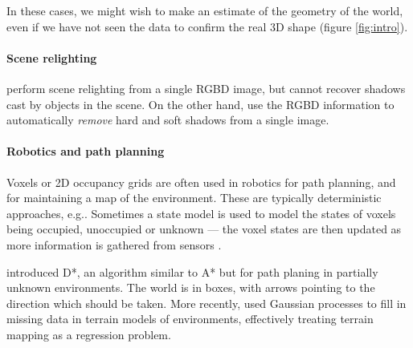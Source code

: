 \documentclass[10pt,twocolumn,letterpaper]{article}
\makeatletter
\renewcommand*{\eg}{e.g.\@\xspace}
\newcommand*{\ea}{et al.\@\xspace}
\makeatother
\begin{document}
In these cases, we might wish to make an estimate of the geometry of the world, even if we have not seen the data to confirm the real 3D shape (figure \ref{fig:intro}).




\paragraph{Scene relighting}
\cite{ikeda-acpr-2013} perform scene relighting from a single RGBD image, but cannot recover shadows cast by objects in the scene.
On the other hand, \cite{xiao-cvpr-2014} use the RGBD information to automatically \textit{remove} hard and soft shadows from a single image.

\paragraph{Robotics and path planning}
Voxels or 2D occupancy grids are often used in robotics for path planning, and for maintaining a map of the environment. 
These are typically deterministic approaches, \eg \cite{jetchev-icra-2010}. Sometimes a state model is used to model the states of voxels being occupied, unoccupied or unknown --- the voxel states are then updated as more information is gathered from sensors \cite{toussaint-techreport-2007}.

\cite{stentz-icra-1994} introduced D*, an algorithm similar to A* but for path planing in partially unknown environments. 
The world is in boxes, with arrows pointing to the direction which should be taken.
More recently, \cite{plagemann-iros-2008} used Gaussian processes to fill in missing data in terrain models of environments, effectively treating terrain mapping as a regression problem.
\end{document}
